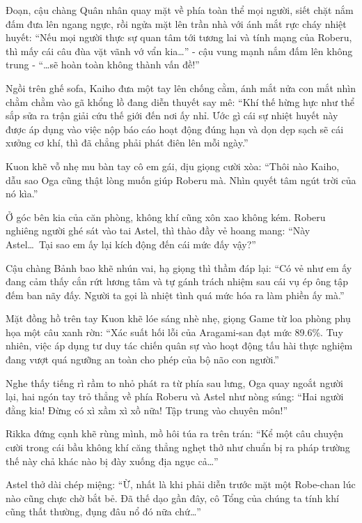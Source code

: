 \documentclass[../main.tex]{subfiles}
\begin{document}
Đoạn, cậu chàng Quân nhân quay mặt về phía toàn thể mọi người, siết chặt nắm đấm đưa lên ngang ngực, rồi ngửa mặt lên trần nhà với ánh mắt rực cháy nhiệt huyết: ``Nếu mọi người thực sự quan tâm tới tương lai và tính mạng của Roberu, thì mấy cái câu đùa vặt vãnh vớ vẩn kia\dots'' - cậu vung mạnh nắm đấm lên không trung - ``\dots sẽ hoàn toàn không thành vấn đề!''

Ngồi trên ghế sofa, Kaiho đưa một tay lên chống cằm, ánh mắt nửa con mắt nhìn chằm chằm vào gã khổng lồ đang diễn thuyết say mê: ``Khí thế hừng hực như thể sắp sửa ra trận giải cứu thế giới đến nơi ấy nhỉ. Ước gì cái sự nhiệt huyết này được áp dụng vào việc nộp báo cáo hoạt động đúng hạn và dọn dẹp sạch sẽ cái xưởng cơ khí, thì đã chẳng phải phát điên lên mỗi ngày.''

Kuon khẽ vỗ nhẹ mu bàn tay cô em gái, dịu giọng cười xòa: ``Thôi nào Kaiho, dẫu sao Oga cũng thật lòng muốn giúp Roberu mà. Nhìn quyết tâm ngút trời của nó kìa.''

Ở góc bên kia của căn phòng, không khí cũng xôn xao không kém. Roberu nghiêng người ghé sát vào tai Astel, thì thào đầy vẻ hoang mang: ``Này Astel\dots\ Tại sao em ấy lại kích động đến cái mức đấy vậy?''

Cậu chàng Bảnh bao khẽ nhún vai, hạ giọng thì thầm đáp lại: ``Có vẻ như em ấy đang cảm thấy cắn rứt lương tâm và tự gánh trách nhiệm sau cái vụ ép ông tập đếm ban nãy đấy. Người ta gọi là nhiệt tình quá mức hóa ra làm phiền ấy mà.''

Mặt đồng hồ trên tay Kuon khẽ lóe sáng nhè nhẹ, giọng Game từ loa phòng phụ họa một câu xanh rờn: ``Xác suất hối lỗi của Aragami-san đạt mức 89.6\%. Tuy nhiên, việc áp dụng tư duy tác chiến quân sự vào hoạt động tấu hài thực nghiệm đang vượt quá ngưỡng an toàn cho phép của bộ não con người.''

Nghe thấy tiếng rì rầm to nhỏ phát ra từ phía sau lưng, Oga quay ngoắt người lại, hai ngón tay trỏ thẳng về phía Roberu và Astel như nòng súng: ``Hai người đằng kia! Đừng có xì xầm xì xồ nữa! Tập trung vào chuyên môn!''

Rikka đứng cạnh khẽ rùng mình, mồ hôi túa ra trên trán: ``Kể một câu chuyện cười trong cái bầu không khí căng thẳng nghẹt thở như chuẩn bị ra pháp trường thế này chả khác nào bị đày xuống địa ngục cả\dots''

Astel thở dài chép miệng: ``Ừ, nhất là khi phải diễn trước mặt một Robe-chan lúc nào cũng chực chờ bắt bẻ. Đã thế dạo gần đây, cô Tổng của chúng ta tính khí cũng thất thường, đụng đâu nổ đó nữa chứ\dots''
\end{document}
